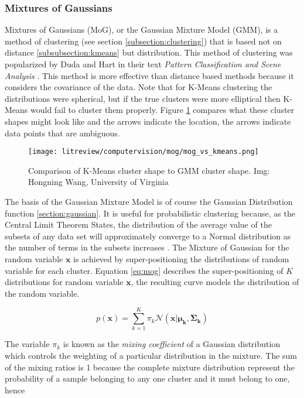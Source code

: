 \subsubsection{Mixtures of Gaussians}
 \label{subsection:mog}

Mixtures of Gaussians (MoG), or the Gaussian Mixture Model (GMM), is a method of clustering (see section \ref{subsection:clustering}) that is based not on distance \ref{subsubsection:kmeans} but distribution. This method of clustering was popularized by Duda and Hart in their text \emph{Pattern Classification and Scene Analysis} \cite{mog_seminal}. This method is more effective than distance based methods because it considers the covariance of the data. Note that for K-Means clustering the distributions were spherical, but if the true clusters were more elliptical then K-Means would fail to cluster them properly. Figure \ref{fig:cluster_shapes} compares what these cluster shapes might look like and the arrows indicate the location, the arrows indicate data points that are ambiguous.

\begin{figure}[h]
	\centering
	\texttt{[image: litreview/computervision/mog/mog\_vs\_kmeans.png]}
	\captionsetup{format = hang}
	\caption{Comparison of K-Means cluster shape to GMM cluster shape. Img: Hongning Wang, University of Virginia }
	\label{fig:cluster_shapes}
\end{figure}
	
The basis of the Gaussian Mixture Model is of course the Gaussian Distribution function \ref{section:gaussian}. It is useful for probabilistic clustering because, as the Central Limit Theorem States, the distribution of the average value of the subsets of any data set will approximately converge to a Normal distribution as the number of terms in the subsets increases \cite{patterns_machine_learning}. The Mixture of Gaussian for the random variable $\boldsymbol{x}$ is achieved by super-positioning the distributions of random variable for each cluster. Equation \ref{eq:mog} describes the super-positioning of $K$ distributions for random variable $\boldsymbol{x}$, the resulting curve models the distribution of the random variable. 

\begin{equation}
p(\boldsymbol{x}) = \sum^{K}_{k = 1}\pi_k \mathcal{N}(\boldsymbol{x}|\boldsymbol{\mu_k}, \boldsymbol{\Sigma_k})
\label{eq:mog}
\end{equation}

The variable $\pi_k$ is known as the \emph{mixing coefficient} of a Gaussian distribution which controls the weighting of a particular distribution in the mixture. The sum of the mixing ratios is 1 because the complete mixture distribution represent the probability of a sample belonging to any one cluster and it must belong to one, hence


